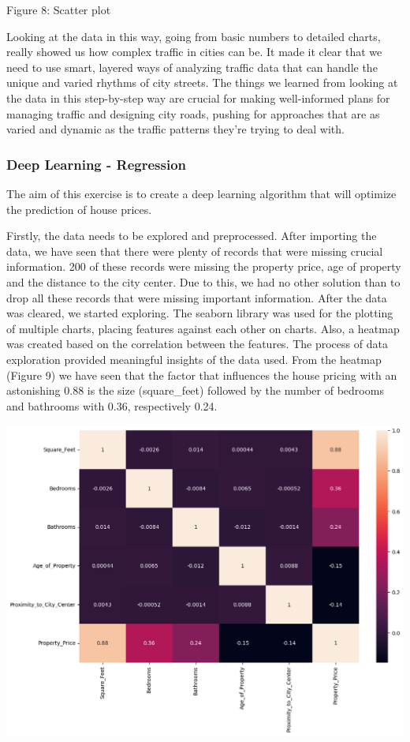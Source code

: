 \documentclass{article}
\begin{document}
\begin{multicols}{2}
{\small
  Figure 8: Scatter plot
  \par
  \vspace{6pt}
}

Looking at the data in this way, going from basic numbers to detailed charts, really showed us how complex traffic in cities can be. It made it clear that we need to use smart, layered ways of analyzing traffic data that can handle the unique and varied rhythms of city streets. The things we learned from looking at the data in this step-by-step way are crucial for making well-informed plans for managing traffic and designing city roads, pushing for approaches that are as varied and dynamic as the traffic patterns they're trying to deal with.

\subsubsection{Deep Learning - Regression}

The aim of this exercise is to create a deep learning algorithm that will optimize the prediction of house prices.

Firstly, the data needs to be explored and preprocessed. After importing the data, we have seen that there were plenty of records that were missing crucial information. 200 of these records were missing the property price, age of property and the distance to the city center. Due to this, we had no other solution than to drop all these records that were missing important information. After the data was cleared, we started exploring. The seaborn library was used for the plotting of multiple charts, placing features against each other on charts. Also, a heatmap was created based on the correlation between the features. The process of data exploration provided meaningful insights of the data used. From the heatmap (Figure 9) we have seen that the factor that influences the house pricing with an astonishing 0.88 is the size (square\_feet) followed by the number of bedrooms and bathrooms with 0.36, respectively 0.24.

\includegraphics[scale=.25]{img/heatDL.png}


\end{multicols}
\end{document}
